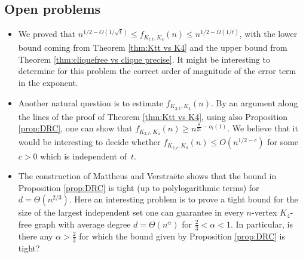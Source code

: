 \documentclass[11pt]{article}
\theoremstyle{plain}
\theoremstyle{definition}
\begin{document}
\subsection{Open problems}
\begin{itemize}
    \item We proved that $n^{1/2 - O(1/\sqrt{t})} \leq f_{K_{t,t},K_4}(n) \leq n^{1/2 - \Omega(1/t)}$, with the lower bound coming from Theorem \ref{thm:Ktt vs K4} and the upper bound from Theorem \ref{thm:cliquefree vs clique precise}. It might be interesting to determine for this problem the correct order of magnitude of the error term in the exponent. 
    \item Another natural question is to estimate $f_{K_{2,t},K_4}(n)$. By an argument along the lines of the proof of Theorem \ref{thm:Ktt vs K4}, using also Proposition \ref{prop:DRC}, one can show that $f_{K_{2,t},K_4}(n) \geq n^{\frac{8}{21}-o_t(1)}$. We believe that it would be interesting to decide whether
$f_{K_{2,t},K_4}(n) \leq O(n^{1/2 - c})$ for some $c > 0$ which is independent of~$t$.
    \item 
    The construction of Mattheus and Verstra\"ete \cite{Mattheus_Verstraete} shows that the bound in Proposition \ref{prop:DRC} is tight (up to polylogarithmic terms) for $d=\Theta(n^{2/3})$. Here an interesting problem is to prove a tight bound for the size of the largest independent set one can guarantee in every $n$-vertex $K_4$-free graph with average degree
    $d = \Theta(n^{\alpha})$ for $\frac{2}{3} < \alpha < 1$. In particular, is there any $\alpha > \frac{2}{3}$ for which the bound given by Proposition \ref{prop:DRC} is tight? 
\end{itemize}



\end{document}
